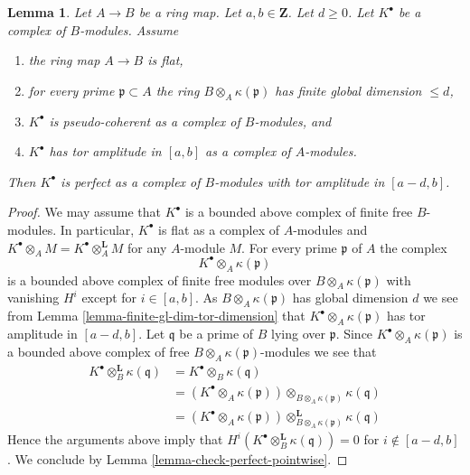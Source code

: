 \documentclass[10pt,a4paper]{amsart}
\theoremstyle{plain}
\newtheorem{lemma}[subsection]{Lemma}
\theoremstyle{definition}
\theoremstyle{remark}
\numberwithin{equation}{subsection}
\begin{document}
\begin{lemma}
\label{lemma-perfect-over-polynomial-ring}
Let $A \to B$ be a ring map. Let $a, b \in \mathbf{Z}$. Let $d \geq 0$.
Let $K^\bullet$ be a complex of $B$-modules. Assume
\begin{enumerate}
\item the ring map $A \to B$ is flat,
\item for every prime $\mathfrak p \subset A$ the ring
$B \otimes_A \kappa(\mathfrak p)$ has finite global dimension $\leq d$,
\item $K^\bullet$ is pseudo-coherent as a complex of $B$-modules, and
\item $K^\bullet$ has tor amplitude in $[a, b]$ as a complex
of $A$-modules.
\end{enumerate}
Then $K^\bullet$ is perfect as a complex of $B$-modules
with tor amplitude in $[a - d, b]$.
\end{lemma}

\begin{proof}
We may assume that $K^\bullet$ is a bounded above complex of
finite free $B$-modules. In particular, $K^\bullet$ is flat as a
complex of $A$-modules and
$K^\bullet \otimes_A M = K^\bullet \otimes_A^{\mathbf{L}} M$ for any
$A$-module $M$. For every prime $\mathfrak p$ of $A$ the complex
$$
K^\bullet \otimes_A \kappa(\mathfrak p)
$$
is a bounded above complex of finite free modules over
$B \otimes_A \kappa(\mathfrak p)$ with vanishing $H^i$ except
for $i \in [a, b]$. As $B \otimes_A \kappa(\mathfrak p)$
has global dimension $d$ we see from
Lemma \ref{lemma-finite-gl-dim-tor-dimension}
that $K^\bullet \otimes_A \kappa(\mathfrak p)$ has tor amplitude in
$[a - d, b]$. Let $\mathfrak q$ be a prime of $B$ lying over $\mathfrak p$.
Since $K^\bullet \otimes_A \kappa(\mathfrak p)$ is a bounded above
complex of free $B \otimes_A \kappa(\mathfrak p)$-modules we see
that
\begin{align*}
K^\bullet \otimes_B^{\mathbf{L}} \kappa(\mathfrak q)
& = K^\bullet \otimes_B \kappa(\mathfrak q) \\
& = (K^\bullet \otimes_A \kappa(\mathfrak p))
\otimes_{B \otimes_A \kappa(\mathfrak p)} \kappa(\mathfrak q) \\
& = (K^\bullet \otimes_A \kappa(\mathfrak p))
\otimes^{\mathbf{L}}_{B \otimes_A \kappa(\mathfrak p)} \kappa(\mathfrak q)
\end{align*}
Hence the arguments above imply that
$H^i(K^\bullet \otimes_B^{\mathbf{L}} \kappa(\mathfrak q)) = 0$
for $i \not \in [a - d, b]$. We conclude by
Lemma \ref{lemma-check-perfect-pointwise}.
\end{proof}
\end{document}
